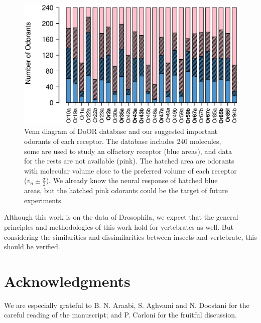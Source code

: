 \documentclass[11pt]{paper} %
\begin{document}
\begin{figure}
\centering
	\includegraphics[width=\textwidth]{fig/odorant-suggest}
	\caption{Venn diagram of DoOR database and our suggested important odorants of each receptor.
			The database includes 240 molecules, 
			some are used to study an olfactory receptor (blue areas), 
			and data for the rests are not available (pink).
			The hatched area are odorants with molecular volume close to the preferred volume of each receptor
			($v_n \pm \frac{\sigma}{2}$).
			We already know the neural response of hatched blue areas, 
			but the hatched pink odorants could be the target of future experiments.
			}
	\label{fig:odorant-suggest}
\end{figure}

Although this work is on the data of Drosophila, 
we expect that the general principles and methodologies of this work hold for vertebrates as well. 
But considering the similarities and dissimilarities between insects and vertebrate, 
this should be verified.

\section{Acknowledgments}
We are especially grateful to B. N. Araabi, S. Aghvami and N. Doostani for the careful reading of the manuscript; and P. Carloni for the fruitful discussion.

\printbibliography
\end{document}
